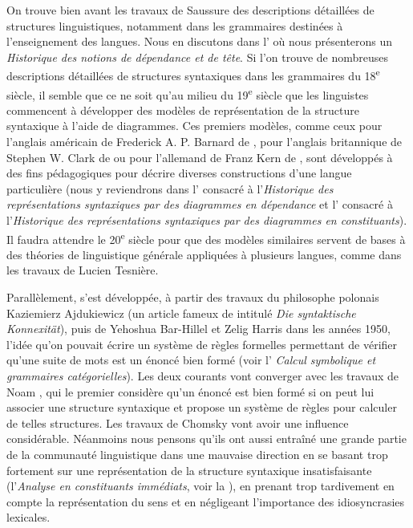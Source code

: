 {    On trouve bien avant les travaux de Saussure des descriptions détaillées de structures linguistiques, notamment dans les grammaires destinées à l’enseignement des langues. Nous en discutons dans l’ où nous présenterons un \textit{Historique des notions de dépendance et de tête}. Si l’on trouve de nombreuses descriptions détaillées de structures syntaxiques dans les grammaires du 18\textsuperscript{e} siècle, il semble que ce ne soit qu’au milieu du 19\textsuperscript{e} siècle que les linguistes commencent à développer des modèles de représentation de la structure syntaxique à l’aide de diagrammes. Ces premiers modèles, comme ceux pour l’anglais américain de Frederick A. P. Barnard de \citeyear{barnard1836analytic}, pour l’anglais britannique de Stephen W. Clark de \citeyear{Clark1847} ou pour l’allemand de Franz Kern de \citeyear{kern1883zur}, sont développés à des fins pédagogiques pour décrire diverses constructions d’une langue particulière (nous y reviendrons dans l’ consacré à l’\textit{Historique des représentations syntaxiques par des diagrammes en dépendance} et l’ consacré à l’\textit{Historique des représentations syntaxiques par des diagrammes en constituants}). Il faudra attendre le 20\textsuperscript{e} siècle pour que des modèles similaires servent de bases à des théories de linguistique générale appliquées à plusieurs langues, comme dans les travaux de Lucien Tesnière.

    Parallèlement, s’est développée, à partir des travaux du philosophe polonais Kaziemierz Ajdukiewicz (un article fameux de \citeyear{ajduckiewicz1935syntaktische} intitulé \textit{Die syntaktische Konnexität}), puis de Yehoshua Bar-Hillel et Zelig Harris dans les années 1950, l’idée qu’on pouvait écrire un système de règles formelles permettant de vérifier qu’une suite de mots est un énoncé bien formé (voir l’ \textit{Calcul symbolique et grammaires catégorielles}). Les deux courants vont converger avec les travaux de Noam \citet{chomsky1957syntactic}, qui le premier considère qu’un énoncé est bien formé si on peut lui associer une structure syntaxique et propose un système de règles pour calculer de telles structures. Les travaux de Chomsky vont avoir une influence considérable. Néanmoins nous pensons qu’ils ont aussi entraîné une grande partie de la communauté linguistique dans une mauvaise direction en se basant trop fortement sur une représentation de la structure syntaxique insatisfaisante (l’\textit{Analyse en constituants immédiats}, voir la ), en prenant trop tardivement en compte la représentation du sens et en négligeant l’importance des idiosyncrasies lexicales.
}
